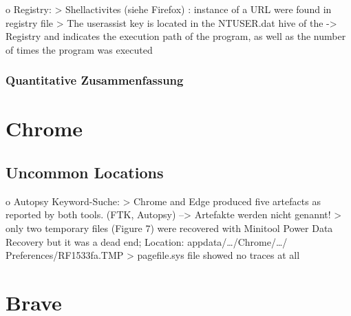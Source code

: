 o Registry:
	> Shellactivites (siehe Firefox) \cite{Muir.2019}: instance of a URL were found in registry file
	> \cite{Nelson.2020} The userassist key is located in the NTUSER.dat hive of the
		 -> Registry and indicates the execution path of the program, as well as the number of times the program was executed 

\subsubsection*{Quantitative Zusammenfassung}



\section{Chrome}

\subsection*{Uncommon Locations}

o Autopsy Keyword-Suche: 
	> Chrome and Edge produced five artefacts as reported by both tools. (FTK, Autopsy) \cite{Gabet.2018}
		--> Artefakte werden nicht genannt!
	> only two temporary files (Figure 7) were recovered with Minitool Power Data Recovery but it was a dead end; Location: appdata/…/Chrome/…/ Preferences/RF1533fa.TMP \cite{Fayyad.2021}
	> pagefile.sys file showed no traces at all \cite{Said.2011}
	

\section{Brave}